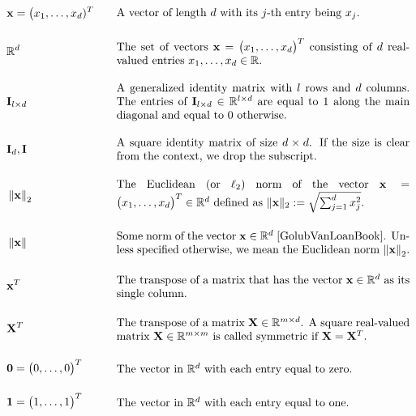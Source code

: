 \begin{align} 
	 &\featurevec=\big(\feature_{1},\ldots,\feature_{\featuredim})^{T} &\quad & \parbox{.75\textwidth}{A vector of length $\featuredim$ with its 
		$\featureidx$-th entry being $\feature_{\featureidx}$.} \nonumber \\[4mm]
	&\mathbb{R}^{\featuredim} & \quad &  \parbox{.75\textwidth}{The set of vectors $\featurevec=\big(\feature_{1},\ldots,\feature_{\featurelen}\big)^{T}$ consisting of $\featuredim$ real-valued entries $\feature_{1},\ldots,\feature_{\featurelen} \in \mathbb{R}$.} \nonumber \\[4mm] 
	&\mathbf{I}_{\modelidx \times \featuredim}  & \quad &  \parbox{.75\textwidth}{A generalized identity matrix 
		with $\modelidx$ rows and $\featuredim$ columns. The entries of $\mathbf{I}_{\modelidx \times \featuredim} \in \mathbb{R}^{\modelidx \times \featuredim}$ 
		are equal to $1$ along the main diagonal and equal to $0$ otherwise. }	\nonumber \\[4mm]%
	&\mathbf{I}_{\dimlocalmodel}, \mathbf{I} & \quad &  \parbox{.75\textwidth}{A square identity 
		matrix of size $\dimlocalmodel \times \dimlocalmodel$. If the size is clear from the 
		context, we drop the subscript.} \nonumber \\[4mm]
	&\normgeneric{\featurevec}{2}  &\quad & \parbox{.75\textwidth}{The Euclidean (or $\ell_{2}$) norm of the vector 
		$\featurevec=\big(\feature_{1},\ldots,\feature_{\featurelen}\big)^{T} \in \mathbb{R}^{\featuredim}$ defined as $ \| \featurevec \|_{2} \defeq \sqrt{\sum_{\featureidx=1}^{\featuredim} \feature_{\featureidx}^{2}}$.} \nonumber \\[4mm] 
	&\normgeneric{\featurevec}{}  & \quad &  \parbox{.75\textwidth}{Some norm of the vector $\featurevec \in \mathbb{R}^{\featuredim}$ \cite{GolubVanLoanBook}. Unless specified otherwise, we mean the Euclidean norm $\normgeneric{\featurevec}{2}$.} \nonumber \\[4mm]
	&\featurevec^{T} &\quad & \parbox{.75\textwidth}{The transpose of a matrix that has the vector 
		$\featurevec \in \mathbb{R}^{\dimlocalmodel}$ as its single column.}  \nonumber \\[4mm]
	&\mathbf{X}^{T} &\quad & \parbox{.75\textwidth}{The transpose of a matrix $\mathbf{X} \in \mathbb{R}^{\samplesize \times \featurelen}$. 
		A square real-valued matrix $\mathbf{X} \in \mathbb{R}^{\samplesize \times \samplesize}$ 
		is called symmetric if $\mathbf{X} = \mathbf{X}^{T}$. }  \nonumber\\[4mm]
	&\mathbf{0}= \big(0,\ldots,0\big)^{T}  & \quad &  \parbox{.75\textwidth}{The vector in $\mathbb{R}^{\dimlocalmodel}$ with each entry equal to zero.} \nonumber\\[4mm]
	&\mathbf{1}= \big(1,\ldots,1\big)^{T}  & \quad &  \parbox{.75\textwidth}{The vector in $\mathbb{R}^{\dimlocalmodel}$ with each entry equal to one.} \nonumber
\end{align} 
